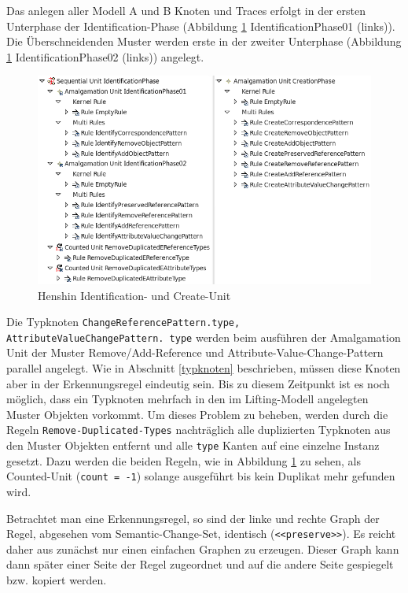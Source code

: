Das anlegen aller Modell A und B Knoten und Traces erfolgt in der ersten Unterphase der
Identification-Phase (Abbildung \ref{fig:hot_identification_and_create_unit}
IdentificationPhase01 (links)). Die Überschneidenden Muster werden erste in der zweiter
Unterphase (Abbildung \ref{fig:hot_identification_and_create_unit} IdentificationPhase02 (links)) angelegt.

\begin{figure}[h!]
  \centering
  \includegraphics[width=1.0\textwidth]{images/hot_identification_and_create_unit.png}
  \caption{Henshin Identification- und Create-Unit}
  \label{fig:hot_identification_and_create_unit}
\end{figure}

Die Typknoten \texttt{ChangeReferencePattern.type, AttributeValueChangePattern. type} werden beim
ausführen der Amalgamation Unit der Muster Remove/Add-Reference und Attribute-Value-Change-Pattern
parallel angelegt. Wie in Abschnitt \ref{typknoten} beschrieben, müssen diese Knoten aber in der
Erkennungsregel eindeutig sein. Bis zu diesem Zeitpunkt ist es noch möglich, dass ein Typknoten
mehrfach in den im Lifting-Modell angelegten Muster Objekten vorkommt. Um dieses Problem zu beheben,
werden durch die Regeln \texttt{Remove-Duplicated-Types} nachträglich alle duplizierten Typknoten
aus den Muster Objekten entfernt und alle \texttt{type} Kanten auf eine einzelne Instanz gesetzt.
Dazu werden die beiden Regeln, wie in Abbildung \ref{fig:hot_identification_and_create_unit} zu
sehen, als Counted-Unit (\texttt{count = -1}) solange ausgeführt bis kein Duplikat mehr gefunden
wird.

Betrachtet man eine Erkennungsregel, so sind der linke und rechte Graph der Regel, abgesehen vom
Semantic-Change-Set, identisch (\texttt{<<preserve>>}). Es reicht daher aus zunächst nur einen
einfachen Graphen zu erzeugen. Dieser Graph kann dann später einer Seite der Regel zugeordnet und
auf die andere Seite gespiegelt bzw. kopiert werden.


